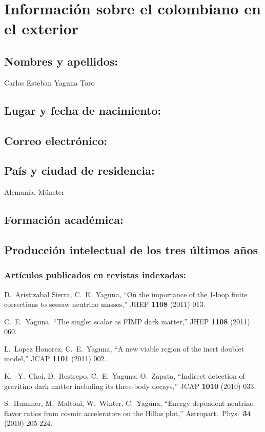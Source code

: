 \section{Información sobre el colombiano en el exterior}
\subsection{Nombres y apellidos: }
Carlos Esteban Yaguna Toro
\subsection{Lugar y fecha de nacimiento: }
\fnyaguna
\subsection{Correo electrónico: }
\emyaguna
\subsection{País y ciudad de residencia: }
Alemania, M\"unster
\subsection{Formación académica:}
\subsection{Producción intelectual de los tres últimos años}
\subsubsection{Artículos publicados en revistas indexadas:}
  D.~Aristizabal Sierra, C.~E.~Yaguna,
  ``On the importance of the 1-loop finite corrections to seesaw neutrino masses,''
  JHEP {\bf 1108 } (2011)  013.

  C.~E.~Yaguna,
  ``The singlet scalar as FIMP dark matter,''
  JHEP {\bf 1108 } (2011)  060.

  L.~Lopez Honorez, C.~E.~Yaguna,
  ``A new viable region of the inert doublet model,''
  JCAP {\bf 1101 } (2011)  002.

  K.~-Y.~Choi, D.~Restrepo, C.~E.~Yaguna, O.~Zapata,
  ``Indirect detection of gravitino dark matter including its three-body decays,''
  JCAP {\bf 1010 } (2010)  033.

  S.~Hummer, M.~Maltoni, W.~Winter, C.~Yaguna,
  ``Energy dependent neutrino flavor ratios from cosmic accelerators on the Hillas plot,''
  Astropart.\ Phys.\  {\bf 34 } (2010)  205-224.

